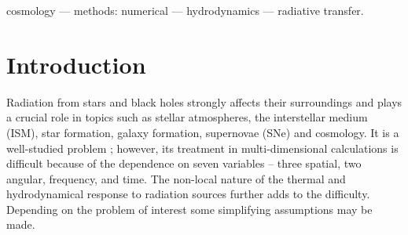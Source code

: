 \documentclass[useAMS,usenatbib]{mn2e}
\begin{document}
\begin{keywords}
  cosmology --- methods: numerical --- hydrodynamics --- radiative
  transfer.
\end{keywords}

\section{Introduction}

Radiation from stars and black holes strongly affects their
surroundings and plays a crucial role in topics such as stellar
atmospheres, the interstellar medium (ISM), star formation, galaxy
formation, supernovae (SNe) and cosmology.  It is a well-studied
problem \citep[e.g.][]{Mathews65, Rybicki, Mihalas84, Yorke86};
however, its treatment in multi-dimensional calculations is difficult
because of the dependence on seven variables -- three spatial, two
angular, frequency, and time.  The non-local nature of the thermal and
hydrodynamical response to radiation sources further adds to the
difficulty.  Depending on the problem of interest some simplifying
assumptions may be made.
\end{document}
